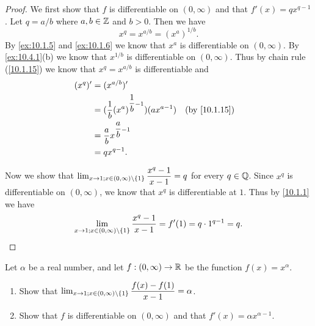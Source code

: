 \begin{proof}
  We first show that \(f\) is differentiable on \((0, \infty)\) and that \(f'(x) = q x^{q - 1}\).
  Let \(q = a / b\) where \(a, b \in \mathbb{Z}\) and \(b > 0\).
  Then we have
  \[
    x^q = x^{a / b} = (x^a)^{1 / b}.
  \]
  By \cref{ex:10.1.5} and \cref{ex:10.1.6} we know that \(x^a\) is differentiable on \((0, \infty)\).
  By \cref{ex:10.4.1}(b) we know that \(x^{1 / b}\) is differentiable on \((0, \infty)\).
  Thus by chain rule (\cref{10.1.15}) we know that \(x^q = x^{a / b}\) is differentiable and
  \begin{align*}
    (x^q)' & = (x^{a / b})'                                                            \\
           & = (\dfrac{1}{b} (x^a)^{\dfrac{1}{b} - 1}) (a x^{a - 1}) &  & \by{10.1.15} \\
           & = \dfrac{a}{b} x^{\dfrac{a}{b} - 1}                                       \\
           & = q x^{q - 1}.
  \end{align*}

  Now we show that \(\lim_{x \to 1 ; x \in (0, \infty) \setminus \left\lbrace1\right\rbrace} \dfrac{x^q - 1}{x - 1} = q\) for every \(q \in \mathbb{Q}\).
  Since \(x^q\) is differentiable on \((0, \infty)\), we know that \(x^q\) is differentiable at \(1\).
  Thus by \cref{10.1.1} we have
  \[
    \lim_{x \to 1 ; x \in (0, \infty) \setminus \left\lbrace1\right\rbrace} \dfrac{x^q - 1}{x - 1} = f'(1) = q \cdot 1^{q - 1} = q.
  \]
\end{proof}

\begin{ex}\label{ex:10.4.3}
  Let \(\alpha\) be a real number, and let \(f : (0, \infty) \to \mathbb{R}\) be the function \(f(x) = x^{\alpha}\).
  \begin{enumerate}
    \item Show that \(\lim_{x \to 1 ; x \in (0, \infty) \setminus \left\lbrace1\right\rbrace} \dfrac{f(x) - f(1)}{x - 1} = \alpha\).
    \item Show that \(f\) is differentiable on \((0, \infty)\) and that \(f'(x) = \alpha x^{\alpha - 1}\).
  \end{enumerate}
\end{ex}

